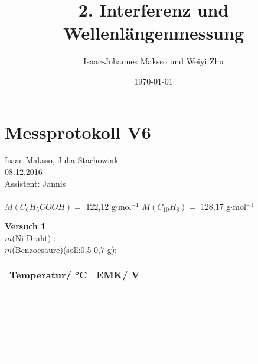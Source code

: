 \documentclass[a4paper,12pt,oneside,onecolum,final,openany]{report}
\title{2. Interferenz und Wellenlängenmessung}
\author{Isaac-Johannes Maksso und Weiyi Zhu}
\date{\today}
\begin{document}
\section{Messprotokoll V6}

Isaac Maksso, Julia Stachowiak\\
08.12.2016\\
Assistent: Jannis\\
\\

$M(C_6H_5COOH)=$ 122,12 g$\cdot$mol$^{-1}$
$M(C_{10}H_8)=$ 128,17 g$\cdot$mol$^{-1}$



\textbf{Versuch 1}\\
$m$(Ni-Draht) :\\
$m$(Benzoesäure)(soll:0,5-0,7 g):\\




\begin{table}[h!]
\begin{tabular}{l|c}
Temperatur/ °C& EMK/ V \\
\hline
 &\\
\hline
 &\\
\hline
 &\\
\hline
 &\\
\hline
 &\\
 \hline
 &\\
\hline
 &\\
\hline
 &\\
\hline
 &\\
\hline
 &\\
 \hline
  &\\
\hline
 &\\
\hline
 &\\
\hline
 &\\
\hline
 &\\
 \hline
  &\\
\hline
 &\\
\hline
 &\\
\hline
 &\\
\hline
 &\\
\hline
& \\ 
 \end{tabular}
\end{table}
\FloatBarrier 
\noindent
\end{document}
